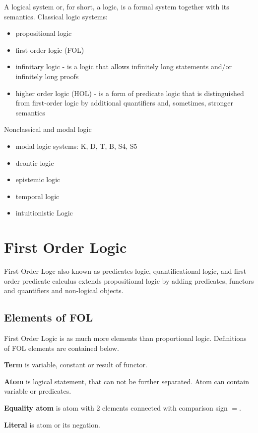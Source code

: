 A logical system or, for short, a logic, is a formal system together with its semantics.
Classical logic systems:

\begin{itemize}
  \item propositional logic 
  \item first order logic (FOL)
  \item infinitary logic - is a logic that allows infinitely long statements and/or infinitely long proofs
  \item higher order logic (HOL) - is a form of predicate logic that is distinguished from first-order logic by additional quantifiers and, sometimes, stronger semantics
\end{itemize}

Nonclassical and modal logic
\begin{itemize}
  \item modal logic systems: K, D, T, B, S4, S5
  \item deontic logic 
  \item epistemic logic
  \item temporal logic
  \item intuitionistic Logic 
\end{itemize}

\section{First Order Logic}

First Order Logc also known as predicates logic, quantificational logic, and first-order predicate calculus extends propositional logic by adding predicates, functors and quantifiers and non-logical objects.

\subsection{Elements of FOL}

First Order Logic is as much more elements than proportional logic. Definitions of FOL elements are contained below.

\textbf{Term}
is variable, constant or result of functor.

\textbf{Atom}
is logical statement, that can not be further separated. Atom can contain variable or predicates.

\textbf{Equality atom}
is atom with 2 elements connected with comparison sign $=$.

\textbf{Literal}
is atom or its negation.

